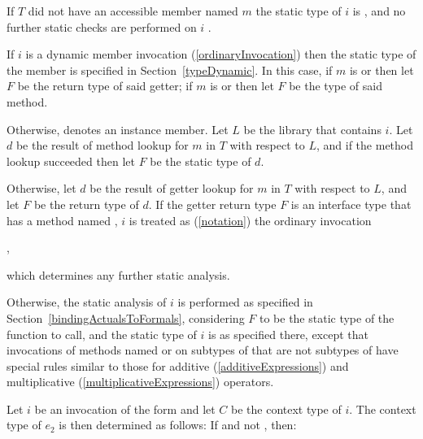 \documentclass[makeidx]{article}
\begin{document}
{\LMHash{}%
If $T$ did not have an accessible member named $m$
the static type of $i$ is \DYNAMIC,
and no further static checks are performed on $i$
.

\LMHash{}%
If $i$ is a dynamic  member invocation
(\ref{ordinaryInvocation})
then the static type of the member is specified in
Section~\ref{typeDynamic}.
In this case, if $m$ is  or 
then let $F$ be the return type of said getter;
if $m$ is  or 
then let $F$ be the type of said method.


\LMHash{}%
Otherwise,  denotes an instance member.
Let $L$ be the library that contains $i$.
Let $d$ be the result of method lookup for $m$ in $T$ with respect to $L$,
and if the method lookup succeeded then let $F$ be the static type of $d$.

\LMHash{}%
Otherwise, let $d$ be the result of getter lookup
for $m$ in $T$ with respect to $L$,
and let $F$ be the return type of $d$.
If the getter return type $F$ is an interface type
that has a method named \CALL,
$i$ is treated as
(\ref{notation})
the ordinary invocation

\noindent
{},

\noindent
which determines any further static analysis.

\LMHash{}%
Otherwise, the static analysis of $i$ is performed
as specified in Section~\ref{bindingActualsToFormals},
considering $F$ to be the static type of the function to call,
and the static type of $i$ is as specified there,
except that invocations of methods named 
or  on subtypes of  that are not subtypes of 
have special rules similar to those for additive (\ref{additiveExpressions})
and multiplicative (\ref{multiplicativeExpressions}) operators.

\LMHash{}%
Let $i$ be an invocation of the form 
and let $C$ be the context type of $i$.
The context type of $e_2$ is then determined as follows:
If  and not , then:

}
\end{document}
